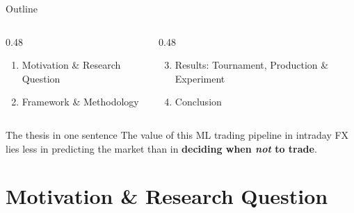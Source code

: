 \documentclass[aspectratio=169, 11pt]{beamer}
\newcommand{\hl}[1]{\textcolor{unibored}{\textbf{#1}}}
\begin{document}
\begin{frame}{Outline}
  \begin{columns}[T,onlytextwidth]
    \begin{column}{0.48\textwidth}
      \begin{enumerate}
        \setlength{\itemsep}{3mm}
        \item Motivation \& Research Question
        \item Framework \& Methodology
      \end{enumerate}
    \end{column}
    \begin{column}{0.48\textwidth}
      \begin{enumerate}
        \setcounter{enumi}{2}
        \setlength{\itemsep}{3mm}
        \item Results: Tournament, Production \& Experiment
        \item Conclusion
      \end{enumerate}
    \end{column}
  \end{columns}
  \vfill
  \begin{block}{The thesis in one sentence}
    The value of this ML trading pipeline in intraday FX lies less in predicting the market than in
    \hl{deciding when \emph{not} to trade}.
  \end{block}
\end{frame}

\section{Motivation \& Research Question}
\end{document}
